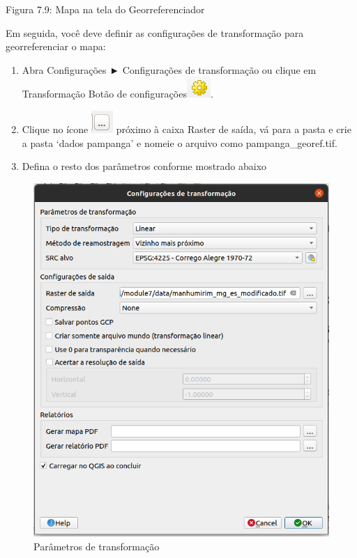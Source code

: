 \documentclass[
]{book}
\providecommand{\tightlist}{%
  \setlength{\itemsep}{0pt}\setlength{\parskip}{0pt}}
\begin{document}
Figura 7.9: Mapa na tela do Georreferenciador

Em seguida, você deve definir as configurações de transformação para georreferenciar o mapa:

\begin{enumerate}
\def\labelenumi{\arabic{enumi}.}
\setcounter{enumi}{2}
\tightlist
\item
  Abra Configurações ► Configurações de transformação ou clique em Transformação Botão de configurações\includegraphics{media/modulo7/georef-settings-btn.png}.
\item
  Clique no ícone \includegraphics{media/modulo7/dots.png} próximo à caixa Raster de saída, vá para a pasta e crie a pasta `dados pampanga' e nomeie o arquivo como pampanga\_georef.tif.
\item
  Defina o resto dos parâmetros conforme mostrado abaixo
\end{enumerate}

\begin{figure}
\centering
\includegraphics{media/modulo7/transformation-settings.png}
\caption{Parâmetros de transformação}
\end{figure}
\end{document}
